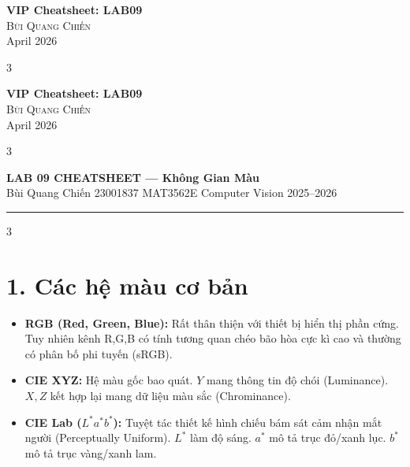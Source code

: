\documentclass[9pt,landscape,a4paper]{extarticle}
\begin{document}
\begin{center}
    {\Large \bfseries VIP Cheatsheet: LAB09} \\
    \vspace{0.3cm}
    {\large \textsc{Bùi Quang Chiến}} \\
    \vspace{0.2cm}
    {\small April 2026}
\end{center}
\vspace{0.3cm}

\begin{multicols*}{3}

\begin{center}
    {\Large \bfseries VIP Cheatsheet: LAB09} \\
    \vspace{0.3cm}
    {\large \textsc{Bùi Quang Chiến}} \\
    \vspace{0.2cm}
    {\small April 2026}
\end{center}
\vspace{0.3cm}

\begin{multicols*}{3}

\begin{center}
  {\large\bfseries\color{hdr} LAB 09 CHEATSHEET --- Không Gian Màu} \\[1pt]
  {\small Bùi Quang Chiến \textbullet{} 23001837 \textbullet{} MAT3562E Computer Vision 2025--2026}
\end{center}
\hrule\vspace{2pt}

\begin{multicols}{3}

\section{1. Các hệ màu cơ bản}
\begin{itemize}
    \item \textbf{RGB (Red, Green, Blue):} Rất thân thiện với thiết bị hiển thị phần cứng. Tuy nhiên kênh R,G,B có tính tương quan chéo bão hòa cực kì cao và thường có phân bố phi tuyến (sRGB).
    \item \textbf{CIE XYZ:} Hệ màu gốc bao quát. $Y$ mang thông tin độ chói (Luminance). $X, Z$ kết hợp lại mang dữ liệu màu sắc (Chrominance).
    \item \textbf{CIE Lab ($L^*a^*b^*$):} Tuyệt tác thiết kế hình chiếu bám sát cảm nhận mắt người (Perceptually Uniform). $L^*$ làm độ sáng. $a^*$ mô tả trục đỏ/xanh lục. $b^*$ mô tả trục vàng/xanh lam.
\end{itemize}


\end{multicols}
\end{multicols*}
\end{multicols*}
\end{document}
